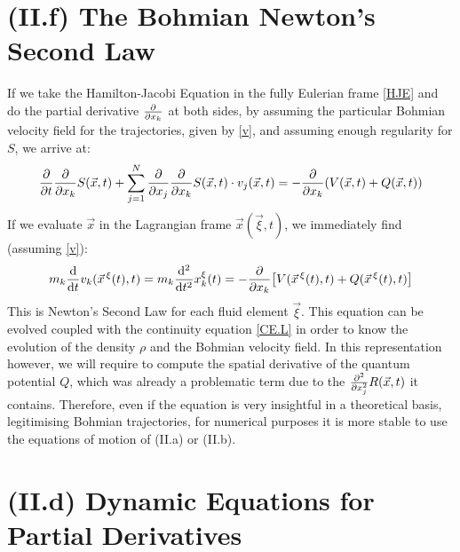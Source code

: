 \documentclass[11pt, a4paper]{article} %
\begin{document}
\section*{(II.f) The Bohmian Newton's Second Law}
If we take the Hamilton-Jacobi Equation in the fully Eulerian frame \eqref{HJE} and do the partial derivative $\pdv{}{x_k}$ at both sides, by assuming the particular Bohmian velocity field for the trajectories, given by \eqref{v}, and assuming enough regularity for $S$, we arrive at:
\begin{equation}
\pdv{}{t}\pdv{}{x_k}S(\vec{x},t)+\sum_{j=1}^N\pdv{}{x_j}\pdv{}{x_k}S(\vec{x},t)\cdot v_j(\vec{x},t)=-\pdv{}{x_k}\qty(V(\vec{x},t)+Q(\vec{x},t))
\end{equation}
If we evaluate $\vec{x}$ in the Lagrangian frame $\vec{x}(\vec{\xi},t)$, we immediately find (assuming \eqref{v}):
\begin{equation}
m_k\dv{}{t}v_k(\vec{x}^{\, \xi}(t),t)=m_k\dv[2]{}{t}x^\xi_k(t)=-\pdv{}{x_k}\qty[V(\vec{x}^{\, \xi}(t),t)+Q(\vec{x}^{\, \xi}(t),t) ]\vspace{-0.1cm}
\end{equation}
This is Newton's Second Law for each fluid element $\vec{\xi}$. This equation can be evolved coupled with the continuity equation \eqref{CE.L} in order to know the evolution of the density $\rho$ and the Bohmian velocity field. In this representation however, we will require to compute the spatial derivative of the quantum potential $Q$, which was already a problematic term due to the $\pdv[2]{}{x_j}R(\vec{x},t)$ it contains. Therefore, even if the equation is very insightful in a theoretical basis, legitimising Bohmian trajectories, for numerical purposes it is more stable to use the equations of motion of (II.a) or (II.b).\vspace{-0.2cm}


\section*{(II.d) Dynamic Equations for Partial Derivatives\vspace{-0.2cm}}
\end{document}
